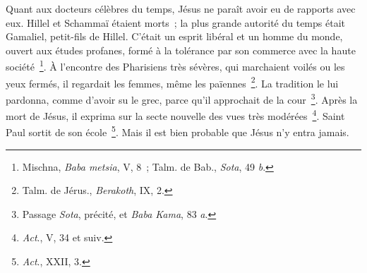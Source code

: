 \documentclass[french,twoside]{book} %
\begin{document}
Quant aux docteurs célèbres du temps, Jésus ne paraît avoir eu de rapports avec eux. Hillel et Schammaï étaient morts ; la plus grande autorité du temps était Gamaliel, petit-fils de Hillel. C’était un esprit libéral et un homme du monde, ouvert aux études profanes, formé à la tolérance par son commerce avec la haute société \footnote{ Mischna, {\itshape Baba metsia}, V, 8 ; Talm. de Bab., {\itshape Sota}, 49 {\itshape b}.}. À l’encontre des Pharisiens très sévères, qui marchaient voilés ou les yeux fermés, il regardait les femmes, même les païennes \footnote{ Talm. de Jérus., {\itshape Berakoth}, IX, 2.}. La tradition le lui pardonna, comme d’avoir su le grec, parce qu’il approchait de la cour \footnote{ Passage {\itshape Sota}, précité, et {\itshape Baba Kama}, 83 {\itshape a}.}. Après la mort de Jésus, il exprima sur la secte nouvelle des vues très modérées \footnote{{\itshape Act}., V, 34 et suiv.}. Saint Paul sortit de son école \footnote{{\itshape Act}., XXII, 3.}. Mais il est bien probable que Jésus n’y entra jamais.\par
\end{document}
